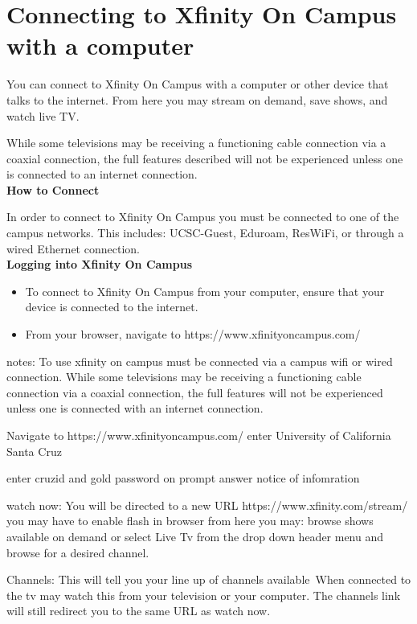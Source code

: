\documentclass[a4paper, 11pt]{article}
\begin{document}




\section*{
  Connecting to Xfinity On Campus with a computer
}

You can connect to Xfinity On Campus with a computer or other device that
talks to the internet.  From here you may stream on demand, save shows, and 
watch live TV. 

While some televisions may be receiving a functioning cable connection via
a coaxial connection, the full features described will not be 
experienced unless one is connected to an internet connection.\\
{\newline}
\textbf{How to Connect}

In order to connect to Xfinity On Campus you must be connected to one of the
campus networks.  This includes: UCSC-Guest, Eduroam, ResWiFi, or through a 
wired Ethernet connection.\\
{\newline}
\textbf{Logging into Xfinity On Campus}
\begin{itemize}
  \item To connect to Xfinity On Campus from your computer, ensure that your device  is connected to the internet. 
  \item From your browser, navigate to https://www.xfinityoncampus.com/ 



\end{itemize}
notes:
To use xfinity on campus must be connected via a campus wifi or wired
connection.
While some televisions may be receiving a functioning cable connection via
a coaxial connection, the full features will not be experienced unless one
is connected with an internet connection.

Navigate to https://www.xfinityoncampus.com/
enter University of California Santa Cruz

enter cruzid and gold password on prompt
answer notice of infomration

watch now:
  You will be directed to a new URL https://www.xfinity.com/stream/
  you may have to enable flash in browser
  from here you may:
  browse shows available on demand
  or select Live Tv from the drop down header menu and browse for a desired
  channel.

Channels:
  This will tell you your line up of channels available\
  When connected to the tv may watch this from your television or your computer.  The channels link will still redirect you to the same URL as 
  watch now.


  
\end{document}
